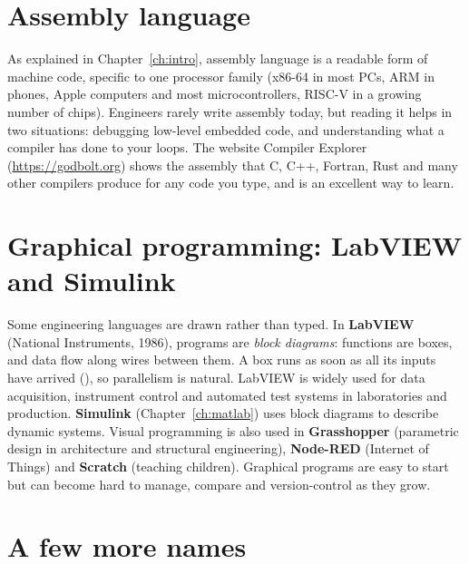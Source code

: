 \section{Assembly language}

As explained in Chapter~\ref{ch:intro}, assembly language is a readable form of machine
code, specific to one processor family (x86-64 in most PCs, ARM in phones, Apple
computers and most microcontrollers, RISC-V in a growing number of chips). Engineers rarely
write assembly today, but reading it helps in two situations: debugging low-level embedded
code, and understanding what a compiler has done to your loops. The website Compiler
Explorer (\url{https://godbolt.org}) shows the assembly that C, C++, Fortran, Rust and many
other compilers produce for any code you type, and is an excellent way to learn.

\section{Graphical programming: LabVIEW and Simulink}

Some engineering languages are drawn rather than typed. In \textbf{LabVIEW} (National
Instruments, 1986), programs are \emph{block diagrams}: functions are boxes, and data flow
along wires between them. A box runs as soon as all its inputs have arrived
(), so parallelism is natural. LabVIEW is widely used for data
acquisition, instrument control and automated test systems in laboratories and production.
\textbf{Simulink} (Chapter~\ref{ch:matlab}) uses block diagrams to describe dynamic systems.
Visual programming is also used in \textbf{Grasshopper} (parametric design in architecture
and structural engineering), \textbf{Node-RED} (Internet of Things) and \textbf{Scratch}
(teaching children). Graphical programs are easy to start but can become hard to manage,
compare and version-control as they grow.

\section{A few more names}

